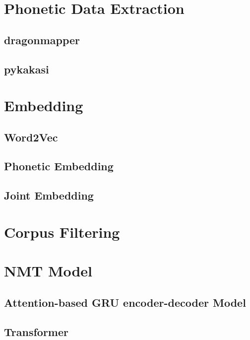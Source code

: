 \newpage

\section{Phonetic Data Extraction} \label{sec:phonetic_data}
\subsection{dragonmapper} \label{sec:dragonmapper}
\subsection{pykakasi} \label{sec:pykakasi}

\section{Embedding} \label{sec:embedding}
\subsection{Word2Vec} \label{sec:word2vec}
\subsection{Phonetic Embedding} \label{sec:phonetic_embedding}
\subsection{Joint Embedding} \label{sec:joint_embedding}

\section{Corpus Filtering} \label{sec:corpus_filtering}

\section{NMT Model} \label{sec:nmt_model}
\subsection{Attention-based GRU encoder-decoder Model} \label{sec:rnn}
\subsection{Transformer} \label{sec:transformer}

